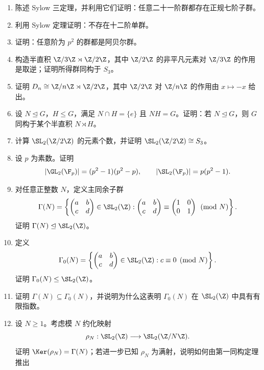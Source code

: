 \begin{enumerate}[start=56, label=\textbf{习题6.\arabic*.}, leftmargin=7em]
  \item \hard 陈述 Sylow 三定理，并利用它们证明：任意二十一阶群都存在正规七阶子群。
  \item \hard 利用 Sylow 定理证明：不存在十二阶单群。
  \item \hard 证明：任意阶为 $p^2$ 的群都是阿贝尔群。
  \item \hard 构造半直积 $\Z/3\Z \rtimes \Z/2\Z$，其中 $\Z/2\Z$ 的非平凡元素对 $\Z/3\Z$ 的作用是取逆；证明所得群同构于 $S_3$。
  \item \hard 证明 $D_n \cong \Z/n\Z \rtimes \Z/2\Z$，其中 $\Z/2\Z$ 对 $\Z/n\Z$ 的作用由 $x\mapsto -x$ 给出。
  \item \hard 设 $N\trianglelefteq G$，$H\le G$，满足 $N\cap H=\{e\}$ 且 $NH=G$。证明：若 $N\trianglelefteq G$，则 $G$ 同构于某个半直积 $N \rtimes H$。
  \item \hard 计算 $\SL_2(\Z/2\Z)$ 的元素个数，并证明 $\SL_2(\Z/2\Z) \cong S_3$。
  \item \hard 设 $p$ 为素数。证明
  \[
    |\GL_2(\F_p)|=(p^2-1)(p^2-p), \qquad |\SL_2(\F_p)|=p(p^2-1).
  \]
  \item \hard 对任意正整数 $N$，定义主同余子群
  \[
    \Gamma(N)=\left\{\begin{pmatrix}a&b\\ c&d\end{pmatrix}\in \SL_2(\Z):
    \begin{pmatrix}a&b\\ c&d\end{pmatrix} \equiv \begin{pmatrix}1&0\\ 0&1\end{pmatrix} \pmod N\right\}.
  \]
  证明 $\Gamma(N)\trianglelefteq \SL_2(\Z)$。
  \item \hard 定义
  \[
    \Gamma_0(N)=\left\{\begin{pmatrix}a&b\\ c&d\end{pmatrix}\in \SL_2(\Z): c \equiv0 \pmod N\right\}.
  \]
  证明 $\Gamma_0(N)\le \SL_2(\Z)$。
  \item \hard 证明 $\Gamma(N)\subseteq \Gamma_0(N)$，并说明为什么这表明 $\Gamma_0(N)$ 在 $\SL_2(\Z)$ 中具有有限指数。
  \item \hard 设 $N\ge1$。考虑模 $N$ 约化映射
  \[
    \rho_N:\SL_2(\Z) \longrightarrow \SL_2(\Z/N\Z).
  \]
  证明 $\Ker(\rho_N)=\Gamma(N)$；若进一步已知 $\rho_N$ 为满射，说明如何由第一同构定理推出

\end{enumerate}
